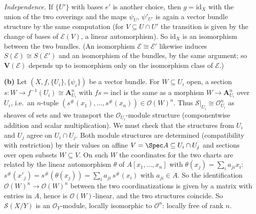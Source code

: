 \documentclass[11pt]{article}
\begin{document}
\emph{Independence.} If $\{U'\}$ with bases $e'$ is another choice, then $g=\mathrm{id}_X$ with the union of the two coverings and the maps $\psi_U$, $\psi'_{U'}$ is again a vector bundle structure by the same computation (for $V\subseteq U\cap U'$ the transition is given by the change of bases of $\mathcal E(V)$, a linear automorphism). So $\mathrm{id}_X$ is an isomorphism between the two bundles. (An isomorphism $\mathcal E\cong\mathcal E'$ likewise induces $S(\mathcal E)\cong S(\mathcal E')$ and an isomorphism of the bundles, by the same argument; so $\mathbf V(\mathcal E)$ depends up to isomorphism only on the isomorphism class of $\mathcal E$.)

\textbf{(b)} Let $(X,f,\{U_i\},\{\psi_i\})$ be a vector bundle. For $W\subseteq U_i$ open, a section $s:W\to f^{-1}(U_i)\cong\mathbf A^n_{U_i}$ with $fs=\mathrm{incl}$ is the same as a morphism $W\to\mathbf A^n_{U_i}$ over $U_i$, i.e.\ an $n$-tuple $(s^\#(x_1),\dots,s^\#(x_n))\in\mathcal O(W)^n$. Thus $\mathcal S|_{U_i}\cong\mathcal O_{U_i}^n$ as sheaves of sets and we transport the $\mathcal O_{U_i}$-module structure (componentwise addition and scalar multiplication). We must check that the structures from $U_i$ and $U_j$ agree on $U_i\cap U_j$. Both module structures are determined (compatibility with restriction) by their values on affine $V=\Spec A\subseteq U_i\cap U_j$ and sections over open subsets $W\subseteq V$. On such $W$ the coordinates for the two charts are related by the linear automorphism $\theta$ of $A[x_1,\dots,x_n]$ with $\theta(x_j)=\sum_ia_{ji}x_i$: $s^\#(x'_j)=s^\#(\theta(x_j))=\sum_ia_{ji}\,s^\#(x_i)$ with $a_{ji}\in A$. So the identification $\mathcal O(W)^n\to\mathcal O(W)^n$ between the two coordinatizations is given by a matrix with entries in $A$, hence is $\mathcal O(W)$-linear, and the two structures coincide. So $\mathcal S(X/Y)$ is an $\mathcal O_Y$-module, locally isomorphic to $\mathcal O^n$: locally free of rank $n$.
\end{document}
